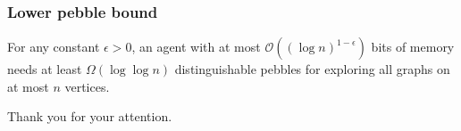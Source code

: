 \documentclass{beamer}
\begin{document}
\begin{frame}
  \frametitle{Lower pebble bound}
  \begin{theorem}
    For any constant $\epsilon > 0$, an agent with at most
    $\mathcal{O}((\log n)^{1-\epsilon})$ bits of memory needs at least
    $\Omega(\log\log n)$ distinguishable pebbles for exploring all
    graphs on at most $n$ vertices.
  \end{theorem}
\end{frame}

\begin{frame}
  \begin{center}
    \Huge Thank you for your attention.
  \end{center}
\end{frame}
\end{document}
